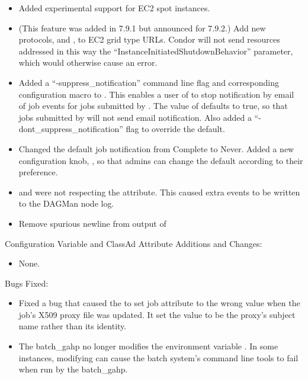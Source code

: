 \begin{itemize}

\item Added experimental support for EC2 spot instances.

\item (This feature was added in 7.9.1 but announced for 7.9.2.)  Add new
protocols,  and , to EC2 grid type URLs.  
Condor will not send resources addressed in this way the
``InstanceInitiatedShutdownBehavior'' parameter, which would otherwise cause
an error.

\item Added a ``-suppress\_notification'' command line flag and corresponding
 configuration macro to .
This enables a user of  to stop notification by email of job
events for jobs submitted by . The value of
 defaults to true, so that jobs submitted
by  will not send email notification. Also added a
``-dont\_suppress\_notification'' flag to override the default.

\item Changed the default job notification from Complete to Never. Added a new
configuration knob, , so that admins can
change the default according to their preference.

\item {} and  were not respecting the
 attribute. This caused extra events to be written to
the DAGMan node log.

\item Remove spurious newline from output of 

\end{itemize}

\noindent Configuration Variable and ClassAd Attribute Additions and Changes:

\begin{itemize}

\item None.

\end{itemize}

\noindent Bugs Fixed:

\begin{itemize}

\item Fixed a bug that caused the  to set job attribute
 to the wrong value when the job's X509
proxy file was updated. It set the value to be the proxy's subject name
rather than its identity.

\item The batch\_gahp no longer modifies the environment variable
.
In some instances, modifying  can cause the
batch system's command line tools to fail when run by the batch\_gahp.

\end{itemize}

